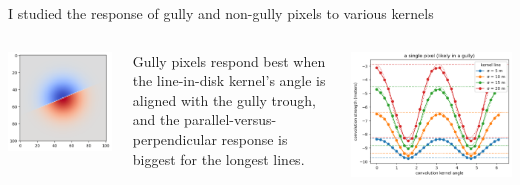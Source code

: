 \documentclass[aspectratio=169]{beamer}
\begin{document}
\begin{frame}{I studied the response of gully and non-gully pixels to various kernels}
\begin{columns}
\begin{minipage}{0.5\linewidth}
\vspace{0.15 cm}
\includegraphics[width=\linewidth]{img/cliff-edge-kernel.png}
\end{minipage}

Gully pixels respond best when the line-in-disk kernel's angle is aligned with the gully trough, and the parallel-versus-perpendicular response is biggest for the longest lines.

\vspace{0.25 cm}
\includegraphics[width=\linewidth]{img/response-to-line-in-disk-convolution.png}
\end{columns}
\end{frame}
\end{document}
